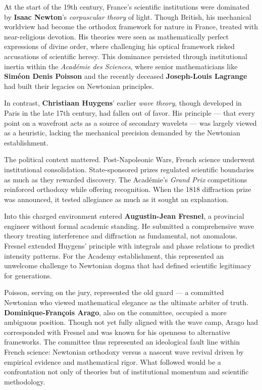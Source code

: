\begin{historical}
At the start of the 19th century, France’s scientific institutions were dominated by \textbf{Isaac Newton}’s \emph{corpuscular theory} of light. Though British, his mechanical worldview had become the orthodox framework for nature in France, treated with near-religious devotion. His theories were seen as mathematically perfect expressions of divine order, where challenging his optical framework risked accusations of scientific heresy. This dominance persisted through institutional inertia within the \emph{Académie des Sciences}, where senior mathematicians like \textbf{Siméon Denis Poisson} and the recently deceased \textbf{Joseph-Louis Lagrange} had built their legacies on Newtonian principles.

In contrast, \textbf{Christiaan Huygens}’ earlier \emph{wave theory}, though developed in Paris in the late 17th century, had fallen out of favor. His principle — that every point on a wavefront acts as a source of secondary wavelets — was largely viewed as a heuristic, lacking the mechanical precision demanded by the Newtonian establishment.

The political context mattered. Post-Napoleonic Wars, French science underwent institutional consolidation. State-sponsored prizes regulated scientific boundaries as much as they rewarded discovery. The Académie’s \emph{Grand Prix} competitions reinforced orthodoxy while offering recognition. When the 1818 diffraction prize was announced, it tested allegiance as much as it sought an explanation.

Into this charged environment entered \textbf{Augustin-Jean Fresnel}, a provincial engineer without formal academic standing. He submitted a comprehensive wave theory treating interference and diffraction as fundamental, not anomalous. Fresnel extended Huygens’ principle with integrals and phase relations to predict intensity patterns. For the Academy establishment, this represented an unwelcome challenge to Newtonian dogma that had defined scientific legitimacy for generations.

Poisson, serving on the jury, represented the old guard — a committed Newtonian who viewed mathematical elegance as the ultimate arbiter of truth. \textbf{Dominique-François Arago}, also on the committee, occupied a more ambiguous position. Though not yet fully aligned with the wave camp, Arago had corresponded with Fresnel and was known for his openness to alternative frameworks. The committee thus represented an ideological fault line within French science: Newtonian orthodoxy versus a nascent wave revival driven by empirical evidence and mathematical rigor. What followed would be a confrontation not only of theories but of institutional momentum and scientific methodology.
\end{historical}
